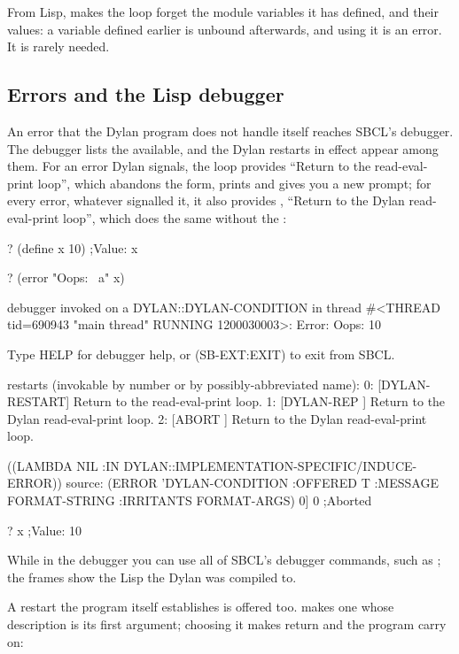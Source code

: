 From Lisp,  makes the loop forget the
module variables it has defined, and their values: a variable defined
earlier is unbound afterwards, and using it is an error. It is rarely
needed.

\subsection{Errors and the Lisp debugger}\label{sec:lisp-errors}

An error that the Dylan program does not handle itself reaches SBCL's
debugger. The debugger lists the  available, and the Dylan
restarts in effect appear among them. For an error Dylan signals, the
loop provides ``Return to the read-eval-print loop'', which abandons the
form, prints  and gives you a new  prompt; for
every error, whatever signalled it, it also provides ,
``Return to the Dylan read-eval-print loop'', which does the same
without the :

\begin{repl}
? (define x 10)
;Value: x

? (error "Oops: ~a" x)

debugger invoked on a DYLAN::DYLAN-CONDITION in thread
#<THREAD tid=690943 "main thread" RUNNING {1200030003}>:
  Error: Oops: 10

Type HELP for debugger help, or (SB-EXT:EXIT) to exit from SBCL.

restarts (invokable by number or by possibly-abbreviated name):
  0: [DYLAN-RESTART] Return to the read-eval-print loop.
  1: [DYLAN-REP    ] Return to the Dylan read-eval-print loop.
  2: [ABORT        ] Return to the Dylan read-eval-print loop.

((LAMBDA NIL :IN DYLAN::IMPLEMENTATION-SPECIFIC/INDUCE-ERROR))
   source: (ERROR 'DYLAN-CONDITION :OFFERED T :MESSAGE FORMAT-STRING :IRRITANTS
                  FORMAT-ARGS)
0] 0
;Aborted

? x
;Value: 10
\end{repl}

\noindent
While in the debugger you can use all of SBCL's debugger commands, such
as ; the frames show the Lisp the Dylan was compiled to.

A restart the program itself establishes is offered too. 
makes one whose description is its first argument; choosing it makes
 return  and the program carry on:


